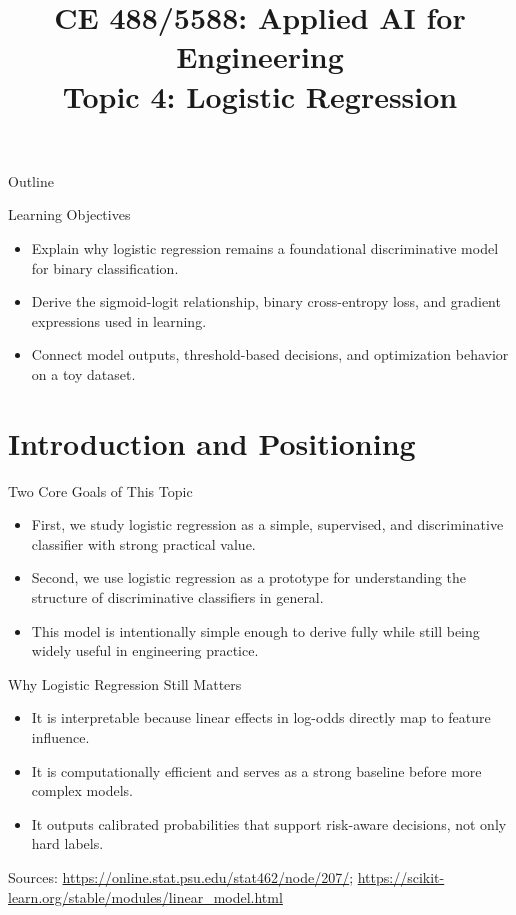 \documentclass[10pt]{beamer}
\title{CE 488/5588: Applied AI for Engineering\\ \large Topic 4: Logistic Regression}
\author{}
\institute{}
\date{}
\begin{document}
\begin{frame}
  \titlepage
\end{frame}

\begin{frame}{Outline}
  \justifying
  \tableofcontents
\end{frame}

\begin{frame}{Learning Objectives}
  \justifying
  \begin{itemize}
    \item Explain why logistic regression remains a foundational discriminative model for binary classification.
    \item Derive the sigmoid-logit relationship, binary cross-entropy loss, and gradient expressions used in learning.
    \item Connect model outputs, threshold-based decisions, and optimization behavior on a toy dataset.
  \end{itemize}
\end{frame}

\section{Introduction and Positioning}

\begin{frame}{Two Core Goals of This Topic}
  \justifying
  \begin{itemize}
    \item First, we study logistic regression as a simple, supervised, and discriminative classifier with strong practical value.
    \item Second, we use logistic regression as a prototype for understanding the structure of discriminative classifiers in general.
    \item This model is intentionally simple enough to derive fully while still being widely useful in engineering practice.
  \end{itemize}
\end{frame}

\begin{frame}{Why Logistic Regression Still Matters}
  \justifying
  \begin{itemize}
    \item It is interpretable because linear effects in log-odds directly map to feature influence.
    \item It is computationally efficient and serves as a strong baseline before more complex models.
    \item It outputs calibrated probabilities that support risk-aware decisions, not only hard labels.
  \end{itemize}
  \vspace{0.5em}
  {\footnotesize Sources: \url{https://online.stat.psu.edu/stat462/node/207/}; \url{https://scikit-learn.org/stable/modules/linear_model.html}}
\end{frame}
\end{document}
